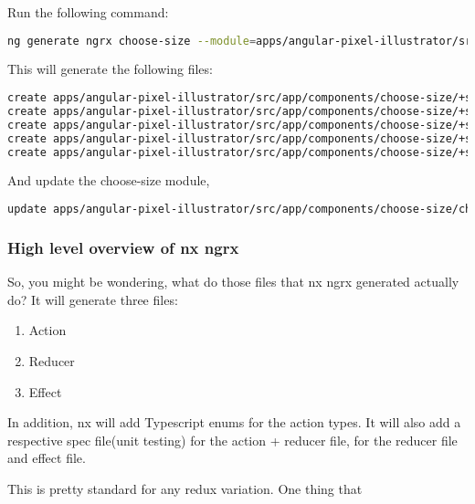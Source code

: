 Run the following command:
\begin{lstlisting}[language=Bash]
ng generate ngrx choose-size --module=apps/angular-pixel-illustrator/src/app/components/choose-size/choose-size.module.ts
\end{lstlisting}

This will generate the following files:
\begin{lstlisting}[language=Bash]
create apps/angular-pixel-illustrator/src/app/components/choose-size/+state/choose-size.actions.ts (684 bytes)
create apps/angular-pixel-illustrator/src/app/components/choose-size/+state/choose-size.reducer.ts (869 bytes)
create apps/angular-pixel-illustrator/src/app/components/choose-size/+state/choose-size.effects.ts (859 bytes)
create apps/angular-pixel-illustrator/src/app/components/choose-size/+state/choose-size.effects.spec.ts (1070 bytes)
create apps/angular-pixel-illustrator/src/app/components/choose-size/+state/choose-size.reducer.spec.ts (364 bytes)
\end{lstlisting}
And update the choose-size module,
\begin{lstlisting}[language=Bash]
update apps/angular-pixel-illustrator/src/app/components/choose-size/choose-size.module.ts
\end{lstlisting}

\subsubsection{ High level overview of nx ngrx }
So, you might be wondering, what do those files that nx ngrx generated actually
do? It will generate three files:
\begin{enumerate}
  \item Action
  \item Reducer
  \item Effect
\end{enumerate}

In addition, nx will add Typescript enums for the action types. It will also
add a respective spec file(unit testing) for the action + reducer file, for the
reducer file and effect file.

This is pretty standard for any redux variation. One thing that
